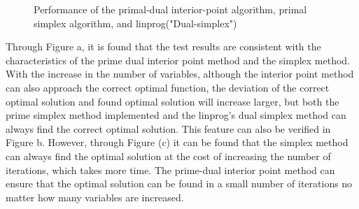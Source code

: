 \begin{figure}[H]
{}
\caption{Performance of the primal-dual interior-point algorithm, primal simplex algorithm, and linprog("Dual-simplex")}
\end{figure}

Through Figure a, it is found that the test results are consistent with the characteristics of the prime dual interior point method and the simplex method. With the increase in the number of variables, although the interior point method can also approach the correct optimal function, the deviation of the correct optimal solution and found optimal solution will increase larger, but both the prime simplex method implemented and the linprog's dual simplex method can always find the correct optimal solution. This feature can also be verified in Figure b. However, through Figure (c) it can be found that the simplex method can always find the optimal solution at the cost of increasing the number of iterations, which takes more time. The prime-dual interior point method can ensure that the optimal solution can be found in a small number of iterations no matter how many variables are increased.
